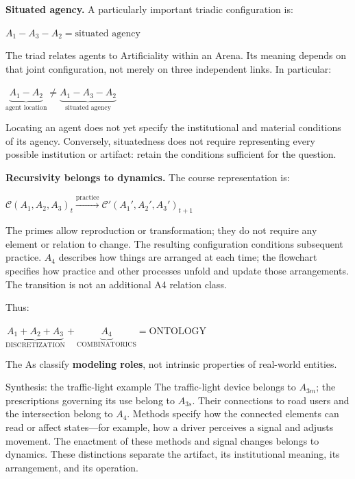 \documentclass[11pt,a4paper]{article}
\newenvironment{fitdisplay}{\par\medskip\noindent\begin{lrbox}{\displaybox}$\displaystyle}{%
$\end{lrbox}\makebox[\linewidth][c]{\ifdim\wd\displaybox>\linewidth\resizebox{\linewidth}{!}{\usebox{\displaybox}}\else\usebox{\displaybox}\fi}\par\medskip}
\begin{document}
\textbf{Situated agency.} A particularly important triadic configuration is:
\begin{fitdisplay}
\boxed{A_1-A_3-A_2=\text{situated agency}}
\end{fitdisplay}
The triad relates agents to Artificiality within an Arena. Its meaning depends on that joint configuration, not merely on three independent links. In particular:
\begin{fitdisplay}
\boxed{\underbrace{A_1-A_2}_{\text{agent location}}
\neq \underbrace{A_1-A_3-A_2}_{\text{situated agency}}}
\end{fitdisplay}
Locating an agent does not yet specify the institutional and material conditions of its agency. Conversely, situatedness does not require representing every possible institution or artifact: retain the conditions sufficient for the question.

\textbf{Recursivity belongs to dynamics.} The course representation is:
\begin{fitdisplay}
\boxed{
\mathcal C(A_1,A_2,A_3)_t
\xrightarrow{\text{practice}}
\mathcal C'(A_1',A_2',A_3')_{t+1}
}
\end{fitdisplay}
The primes allow reproduction or transformation; they do not require any element or relation to change. The resulting configuration conditions subsequent practice. $A_4$ describes how things are arranged at each time; the flowchart specifies how practice and other processes unfold and update those arrangements. The transition is not an additional A4 relation class.

Thus:

\begin{fitdisplay}
\boxed{
\underbrace{A_1+A_2+A_3}_{\text{DISCRETIZATION}}
+
\underbrace{A_4}_{\text{COMBINATORICS}}
=
\text{ONTOLOGY}
}
\end{fitdisplay}

The As classify \textbf{modeling roles}, not intrinsic properties of real-world entities.

\begin{principle}{Synthesis: the traffic-light example}
The traffic-light device belongs to $A_{3m}$; the prescriptions governing its use belong to $A_{3s}$. Their connections to road users and the intersection belong to $A_4$. Methods specify how the connected elements can read or affect states---for example, how a driver perceives a signal and adjusts movement. The enactment of these methods and signal changes belongs to dynamics. These distinctions separate the artifact, its institutional meaning, its arrangement, and its operation.
\end{principle}
\end{document}
